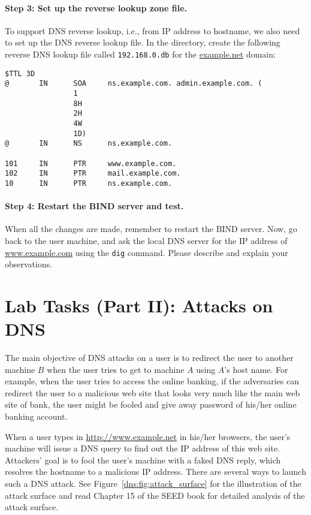 \paragraph{Step 3: Set up the reverse lookup zone file.}
To support DNS reverse lookup, i.e., from IP address to hostname, we also need to
set up the DNS reverse lookup file.
In the  directory, create the following reverse DNS lookup file
called \texttt{192.168.0.db} for the \url{example.net} domain:
\begin{lstlisting}
$TTL 3D
@       IN      SOA     ns.example.com. admin.example.com. (
                1
                8H
                2H
                4W
                1D)
@       IN      NS      ns.example.com.

101     IN      PTR     www.example.com.
102     IN      PTR     mail.example.com.
10      IN      PTR     ns.example.com.
\end{lstlisting}


\paragraph{Step 4: Restart the BIND server and test.}
When all the changes are made, remember to restart the BIND server.
Now, go back to the user machine, and 
ask  the local DNS server for the IP address of
\url{www.example.com} using the \texttt{dig} command. Please 
describe and explain your observations. 






\section{Lab Tasks (Part II): Attacks on DNS}


The main objective of DNS attacks on a user is to redirect the user
to another machine $B$ when the user tries to get to machine $A$ using
$A$'s host name. For example, when the user tries to access the online banking,
if the adversaries can redirect the user 
to a malicious web site that looks very much like the main web site 
of bank, the user might be fooled and give away password
of his/her online banking account.

When a user types in \url{http://www.example.net} 
in his/her browsers, the user's machine will issue
a DNS query to find out the IP address of this web site. Attackers' goal
is to fool the user's machine with a faked DNS reply, which resolves
the hostname to a malicious IP address. There are several ways to launch such 
a DNS attack. See Figure~\ref{dns:fig:attack_surface} for the illustration 
of the attack surface and read Chapter 15 of the SEED book for detailed 
analysis of the attack surface. 

